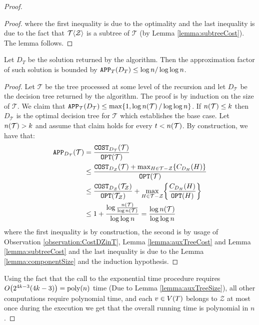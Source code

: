 \begin{theorem}
\begin{proof}
\begin{lemma}
\begin{proof}
        where the first inequality is due to the optimality and the last inequality is due to the fact that $\mathcal{T}\mathopen{}\langle \mathcal{Z} \rangle$ is a subtree of $\mathcal{T}$ (by Lemma \ref{lemma:subtreeCost}). The lemma follows.
    \end{proof}
\end{lemma}
\begin{lemma}
    Let $D_T$ be the solution returned by the algorithm. Then the approximation factor of such solution is bounded by 
    $
    \texttt{APP}_T\mathopen{}\left( D_T \right)\leq \log n/\log\log n
    $.
    \begin{proof}
        Let $\mathcal{T}$ be the tree processed at some level of the recursion and let $D_{\mathcal{T}}$ be the decision tree returned by the algorithm. The proof is by induction on the size of $\mathcal{T}$.  We claim that $\texttt{APP}_{\mathcal{T}}\mathopen{}\left( D_{\mathcal{T}} \right)\leq \max\mathopen{}\left\{ 1, \log n\mathopen{}\left( \mathcal{T} \right)/\log\log n \right\}$. If $n\mathopen{}\left( \mathcal{T} \right)\leq k$ then $D_{\mathcal{T}}$ is the optimal decision tree for $\mathcal{T}$ which establishes the base case. Let $n\mathopen{}\left( \mathcal{T} \right) > k$ and assume that claim holds for every $t< n\mathopen{}\left( \mathcal{T} \right)$. 
        By construction, we have that:
        \begin{align*}
        \texttt{APP}_{D_{\mathcal{T}}}\mathopen{}\left( \mathcal{T} \right)&=\frac{\texttt{COST}_{D_{\mathcal{T}}}\mathopen{}\left( \mathcal{T} \right)}{\texttt{OPT}\mathopen{}\left( \mathcal{T} \right)}\\
        &\leq \frac{\texttt{COST}_{D_{\mathcal{Z}}}\mathopen{}\left( \mathcal{T} \right)+\max_{H\in \mathcal{T}-\mathcal{Z}}\mathopen{}\left\{ C_{D_H}\mathopen{}\left( H \right) \right\}}{\texttt{OPT}\mathopen{}\left( \mathcal{T} \right)}\\
        &\leq 
        \frac{\texttt{COST}_{D_{\mathcal{Z}}}\mathopen{}\left( \mathcal{T}_{\mathcal{Z}} \right)}{\texttt{OPT}\mathopen{}\left( \mathcal{T}_{\mathcal{Z}} \right)}+\max_{H\in \mathcal{T}-\mathcal{Z}}\mathopen{}\left\{ \frac{C_{D_H}\mathopen{}\left( H \right)}{\texttt{OPT}\mathopen{}\left( H \right)} \right\}\\
        &\leq 1+\frac{\log\frac{n\mathopen{}\left( \mathcal{T} \right)}{\log n\mathopen{}\left( \mathcal{T} \right)}}{\log\log n}= \frac{\log n\mathopen{}\left( \mathcal{T} \right)}{\log\log n}
        \end{align*}
        where the first inequality is by construction, the second is by usage of Observation \ref{observation:CostDZinT}, Lemma \ref{lemma:auxTreeCost} and Lemma \ref{lemma:subtreeCost} and the last inequality is due to the Lemma \ref{lemma:componentSize} and the induction hypothesis.
    \end{proof}
\end{lemma}
    Using the fact that the call to the exponential time procedure requires $O\mathopen{}\left( 2^{4k-3}\mathopen{}\left( 4k-3 \right) \right)=\text{poly}\mathopen{}\left( n \right)$ time (Due to Lemma \ref{lemma:auxTreeSize}), all other computations require polynomial time, and each $v\in V\mathopen{}\left( T \right)$ belongs to $\mathcal{Z}$ at most once during the execution we get that the overall running time is polynomial in $n$.
    \end{proof}
\end{theorem}
